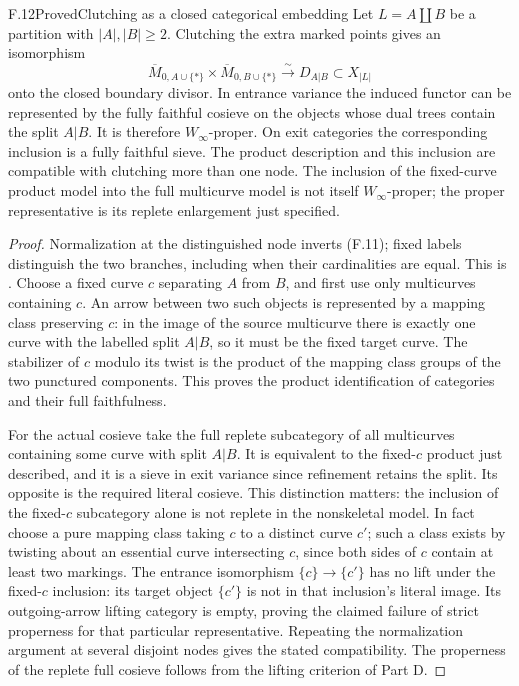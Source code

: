 \begin{statement}{F.12}{Proved}{Clutching as a closed categorical
embedding}
Let $L=A\amalg B$ be a partition with $|A|,|B|\geq2$.  Clutching the
extra marked points gives an isomorphism
\[
 \overline M_{0,A\cup\{*\}}\times
 \overline M_{0,B\cup\{*\}}\xrightarrow{\sim}D_{A|B}\subset X_{|L|}
                                                               \tag{F.11}
\]
onto the closed boundary divisor.  In entrance variance the induced
functor can be represented by the fully faithful cosieve on the
objects whose dual trees contain the split $A|B$.  It is therefore
$W_\infty$-proper.  On exit categories the corresponding inclusion is
a fully faithful sieve.  The product description and this inclusion
are compatible with clutching more than one node.  The inclusion of
the fixed-curve product model into the full multicurve model is not
itself $W_\infty$-proper; the proper representative is its replete
enlargement just specified.
\end{statement}
\begin{proof}
Normalization at the distinguished node inverts (F.11); fixed labels
distinguish the two branches, including when their cardinalities are
equal.  This is \citet[Catalogue, Fact 2]{FKeel1992}.
Choose a fixed curve $c$ separating $A$ from $B$, and first use only
multicurves containing $c$.  An arrow between two such objects is
represented by a mapping class preserving $c$: in the image of the
source multicurve there is exactly one curve with the labelled split
$A|B$, so it must be the fixed target curve.  The stabilizer of $c$
modulo its twist is the product of the mapping class groups of the
two punctured components.  This proves the product identification of
categories and their full faithfulness.

For the actual cosieve take the full replete subcategory of all
multicurves containing some curve with split $A|B$.  It is equivalent
to the fixed-$c$ product just described, and it is a sieve in exit
variance since refinement retains the split.  Its opposite is the
required literal cosieve.  This distinction matters: the inclusion
of the fixed-$c$ subcategory alone is not replete in the nonskeletal
model.  In fact choose a pure mapping class taking $c$ to a distinct
curve $c'$; such a class exists by twisting about an essential curve
intersecting $c$, since both sides of $c$ contain at least two markings.
The entrance isomorphism $\{c\}\to\{c'\}$ has no lift under the
fixed-$c$ inclusion: its target object $\{c'\}$ is not in that
inclusion's literal image.  Its outgoing-arrow lifting category is
empty, proving the claimed failure of strict properness for that
particular representative.  Repeating the normalization argument at
several disjoint nodes gives the stated compatibility.  The properness
of the replete full cosieve follows from the lifting criterion of Part D.
\end{proof}

